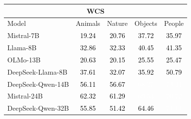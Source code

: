 \begin{figure}[H]
\begin{tabular}{lcccc}
\bottomrule
\end{tabular}
\vspace{1.0em}
\begin{tabular}{lcccc}
\multicolumn{5}{c}{\textbf{WCS}} \\
\toprule
Model & Animals & Nature & Objects & People \\
\midrule
Mistral-7B & \cellcolor[HTML]{DADFEB}\textcolor{black}{19.24} & \cellcolor[HTML]{D6DCE9}\textcolor{black}{20.76} & \cellcolor[HTML]{B5C0D7}\textcolor{black}{37.72} & \cellcolor[HTML]{B9C3D9}\textcolor{black}{35.97} \\
Llama-8B & \cellcolor[HTML]{BFC8DC}\textcolor{black}{32.86} & \cellcolor[HTML]{C1CADD}\textcolor{black}{32.33} & \cellcolor[HTML]{B1BCD5}\textcolor{black}{40.45} & \cellcolor[HTML]{AFBBD4}\textcolor{black}{41.35} \\
OLMo-13B & \cellcolor[HTML]{D6DCE9}\textcolor{black}{20.63} & \cellcolor[HTML]{D8DEEA}\textcolor{black}{20.15} & \cellcolor[HTML]{CCD4E4}\textcolor{black}{25.55} & \cellcolor[HTML]{CED5E5}\textcolor{black}{25.47} \\
DeepSeek-Llama-8B & \cellcolor[HTML]{B5C0D7}\textcolor{black}{37.61} & \cellcolor[HTML]{C1CADD}\textcolor{black}{32.07} & \cellcolor[HTML]{B9C3D9}\textcolor{black}{35.92} & \cellcolor[HTML]{9CAAC9}\textcolor{black}{50.79} \\
DeepSeek-Qwen-14B & \cellcolor[HTML]{92A1C4}\textcolor{black}{56.11} & \cellcolor[HTML]{90A0C3}\textcolor{black}{56.67} & \cellcolor[HTML]{7A8DB8}\textcolor{white}{68.27} & \cellcolor[HTML]{7185B2}\textcolor{white}{73.44} \\
Mistral-24B & \cellcolor[HTML]{8697BE}\textcolor{black}{62.32} & \cellcolor[HTML]{8899BF}\textcolor{black}{61.29} & \cellcolor[HTML]{768AB6}\textcolor{white}{69.54} & \cellcolor[HTML]{7588B4}\textcolor{white}{70.72} \\
DeepSeek-Qwen-32B & \cellcolor[HTML]{92A1C4}\textcolor{black}{55.85} & \cellcolor[HTML]{9CAAC9}\textcolor{black}{51.42} & \cellcolor[HTML]{8294BC}\textcolor{black}{64.46} & \cellcolor[HTML]{6F83B1}\textcolor{white}{74.11} \\
\bottomrule
\end{tabular}
\end{figure}
